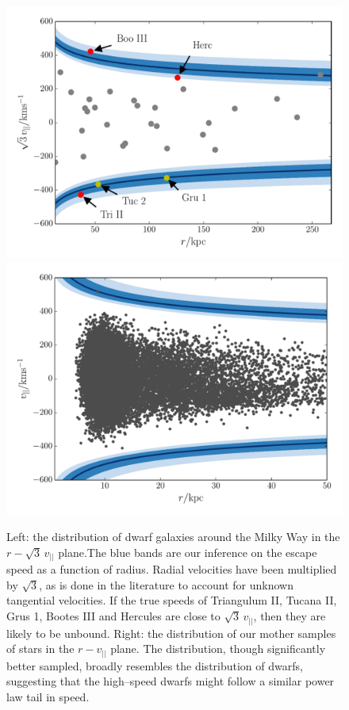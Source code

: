 \documentclass[useAMS,twocolumn,usenatbib]{mn2e}
\def\vlos{{v_{||}}}
\begin{document}
\begin{figure}
\includegraphics[width=\columnwidth]{plots/sats}\hfill 
\includegraphics[width=\columnwidth]{plots/stars_bound}\\
\caption{Left: the distribution of dwarf galaxies around the Milky Way 
in the $r-\sqrt{3}\,\vlos$ plane.The blue bands are our inference on 
the escape speed as a function of radius. Radial velocities have been multiplied 
by $\sqrt{3}$, as is done in the literature to account for unknown 
tangential velocities. If the true speeds of Triangulum II, Tucana II, 
Grus 1, Bootes III and Hercules are close to $\sqrt{3}\,\vlos$, then they are 
likely to be unbound. Right: the distribution of our mother samples of stars 
in the $r-\vlos$ plane. The distribution, though significantly better sampled, 
broadly resembles the distribution of dwarfs, suggesting that the high--speed 
dwarfs might follow a similar power law tail in speed.}
\label{fig:sats}
\end{figure}
\end{document}
